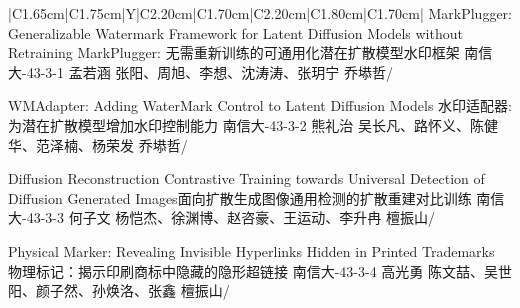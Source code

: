 \Needspace{7.5cm}
\begin{tabularx}{\textwidth}{|C{1.65cm}|C{1.75cm}|Y|C{2.20cm}|C{1.70cm}|C{2.20cm}|C{1.80cm}|C{1.70cm}|}
\HeaderRow
{}
{MarkPlugger: Generalizable Watermark Framework for Latent Diffusion Models without Retraining \newline MarkPlugger: 无需重新训练的可通用化潜在扩散模型水印框架}
{南信大-43-3-1}
{孟若涵}
{张阳、周旭、李想、沈涛涛、张玥宁}
{乔塨哲}{/}

{WMAdapter: Adding WaterMark Control to Latent Diffusion Models\newline  
水印适配器: 为潜在扩散模型增加水印控制能力}
{南信大-43-3-2}
{熊礼治}
{吴长凡、路怀义、陈健华、范泽楠、杨荣发}
{乔塨哲}{/}


{Diffusion Reconstruction Contrastive Training towards Universal Detection of Diffusion Generated Images\newline 面向扩散生成图像通用检测的扩散重建对比训练}
{南信大-43-3-3}
{何子文}
{杨恺杰、徐渊博、赵咨豪、王运动、李升冉}
{檀振山}{/}

{Physical Marker: Revealing Invisible Hyperlinks Hidden in Printed Trademarks\newline 
物理标记：揭示印刷商标中隐藏的隐形超链接}
{南信大-43-3-4}
{高光勇}
{陈文喆、吴世阳、颜子然、孙焕洛、张鑫}
{檀振山}{/}
\end{tabularx}
\BlockGap







